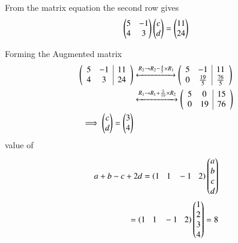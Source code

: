 \documentclass[journal]{IEEEtran}
\begin{document}
    From the matrix equation the second row gives
    \begin{align}
    \begin{pmatrix}
        5 & -1\\
        4 & 3
    \end{pmatrix} \begin{pmatrix}c\\d\end{pmatrix}=\begin{pmatrix}11\\24\end{pmatrix}
    \end{align}

Forming the Augmented matrix
    \begin{align}
       \left(\begin{array}{cc|c}
        5 & -1 & 11\\
        4 & 3 & 24
\end{array}\right) &\xleftrightarrow{R_2 \rightarrow R_2-\frac{4}{5}\times R_1}
\left(\begin{array}{cc|c} 
        5 & -1 & 11\\
        0 & \frac{19}{5} & \frac{76}{5}
\end{array}\right) \\
&\xleftrightarrow{R_1 \rightarrow R_1+\frac{5}{19}\times R_2} \left(\begin{array}{cc|c}
        5 & 0 & 15\\
        0 & 19 & 76
\end{array}\right)\\
\implies \begin{pmatrix}c\\d\end{pmatrix}=\begin{pmatrix}3\\4\end{pmatrix}
    \end{align}
    value of 
    \begin{align}
    a+b-c+2d=    \left(1\hspace{0.3cm}1\hspace{0.3cm}-1\hspace{0.3cm}2\right)\begin{pmatrix}a\\b\\c\\d\end{pmatrix}\\=\left(1\hspace{0.3cm}1\hspace{0.3cm}-1\hspace{0.3cm}2\right)\begin{pmatrix}1\\2\\3\\4\end{pmatrix}=8
    \end{align}
\end{document}
